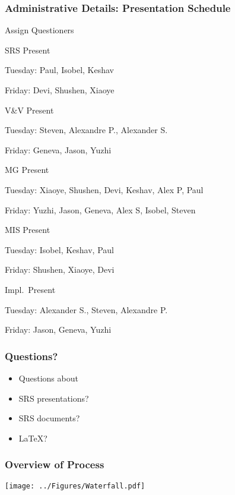 \documentclass[t,12pt,numbers,fleqn]{beamer}
\begin{document}

\begin{frame}
\frametitle{Administrative Details: Presentation Schedule}
Assign Questioners
\bi
\item{SRS Present}
\bi
\item Tuesday: Paul, Isobel, Keshav
\item Friday: Devi, Shushen, Xiaoye
\ei
\item V\&V Present
\bi
\item Tuesday: Steven, Alexandre P., Alexander S.
\item Friday: Geneva, Jason, Yuzhi
\ei
\item MG Present
\bi
\item Tuesday: Xiaoye, Shushen, Devi, Keshav, Alex P, Paul
\item Friday: Yuzhi, Jason, Geneva, Alex S, Isobel, Steven
\ei
\item MIS Present
\bi
\item Tuesday: Isobel, Keshav, Paul
\item Friday: Shushen, Xiaoye, Devi
\ei
\item Impl.\ Present
\bi
\item Tuesday: Alexander S., Steven, Alexandre P.
\item Friday: Jason, Geneva, Yuzhi
\ei

\ei

\end{frame}


\begin{frame}
\frametitle{Questions?}
\begin{itemize}
\item Questions about
\bi
\item SRS presentations?
\item SRS documents?
\item LaTeX?
\ei
\end{itemize}
\end{frame}


\begin{frame}
\frametitle{Overview of Process}

\begin{center}
 \texttt{[image: ../Figures/Waterfall.pdf]}
\end{center}

\end{frame}
\end{document}
